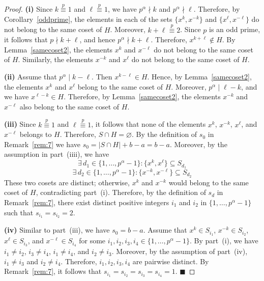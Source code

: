 \documentclass[12pt]{article}
\begin{document}
 \begin{proof}
\textbf{(i)} Since $k\stackrel{p}{\equiv}1$ and $\ell\stackrel{p}{\equiv}1$, we have $p^\alpha\nmid k$ and $p^\alpha\nmid \ell$. Therefore, by Corollary~\ref{oddprime}, the elements in each of the sets $\{x^k,x^{-k}\}$ and $\{x^\ell,x^{-\ell}\}$ do not belong to the same coset of $H$. Moreover, $k+\ell\stackrel{p}{\equiv}2$. Since $p$ is an odd prime, it follows that $p\nmid k+\ell$, and hence $p^\alpha\nmid k+\ell$. Therefore, $x^{k+\ell}\notin H$. By Lemma~\ref{samecoset2}, the elements $x^k$ and $x^{-\ell}$ do not belong to the same coset of $H$. Similarly, the elements $x^{-k}$ and $x^\ell$ do not belong to the same coset of $H$.

\textbf{(ii)} Assume that $p^\alpha\mid k-\ell$. Then $x^{k-\ell}\in H$. Hence, by Lemma~\ref{samecoset2}, the elements $x^k$ and $x^\ell$ belong to the same coset of $H$. Moreover, $p^\alpha\mid \ell-k $, and we have $x^{\ell-k}\in H$. Therefore, by Lemma~\ref{samecoset2}, the elements $x^{-k}$ and $x^{-\ell}$ also belong to the same coset of $H$.

\textbf{(iii)} Since $k\stackrel{p}{\equiv}1$ and $\ell\stackrel{p}{\equiv}1$, it follows that none of the elements $x^k$, $x^{-k}$, $x^\ell$, and $x^{-\ell}$ belongs to $H$. Therefore, $S\cap H=\varnothing$. By the definition of $s_0$ in Remark~\ref{rem:7} we have $s_0=|S\cap H|+b-a=b-a$. Moreover, by the assumption in part~(iiii), we have 	
\[
\exists\, d_1\in\{1,\ldots,p^{\alpha}-1\} :
\{x^{k},x^\ell\}\subseteq S_{d_1}
\]
\[
\exists\, d_2\in\{1,\ldots,p^{\alpha}-1\} :
\{x^{-k},x^{-\ell}\}\subseteq S_{d_2}
\]
These two cosets are distinct; otherwise, $x^k$ and $x^{-k}$ would belong to the same coset of $H$, contradicting part~(i). Therefore,
by the definition of $s_d$ in Remark~\ref{rem:7}, there exist distinct positive integers $i_1$ and $i_2$ in $\{1,\ldots,p^\alpha-1\}$ such that $s_{i_1}=s_{i_2}=2$.

\textbf{(iv)} Similar to part~(iii), we have $s_0=b-a$. Assume that $x^k\in S_{i_1}$, $x^{-k}\in S_{i_2}$, $x^\ell\in S_{i_3}$, and $x^{-\ell}\in S_{i_4}$ for some $i_1, i_2, i_3, i_4 \in \{1,\ldots,p^{\alpha}-1\}$. By part~(i), we have $i_1\neq i_2$, $i_3\neq i_4$, $i_1\neq i_4$, and $i_2\neq i_3$. Moreover, by the assumption of part~(iv), $i_1\neq i_3$ and $i_2\neq i_4$. Therefore, $i_1, i_2, i_3, i_4$ are pairwise distinct. By Remark~\ref{rem:7}, it follows that $s_{i_1}=s_{i_2}=s_{i_3}=s_{i_4}=1$. \hfill$\blacksquare$	
 	\end{proof}
 	
\end{document}
